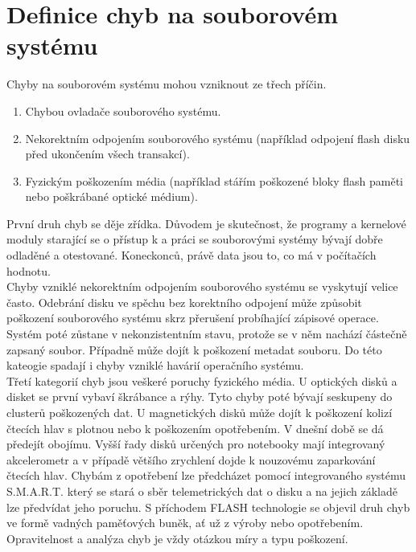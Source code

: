 \chapter{Definice chyb na souborovém systému}
Chyby na souborovém systému mohou vzniknout ze třech příčin. 
\begin{enumerate}
    \item Chybou ovladače souborového systému.
    \item Nekorektním odpojením souborového systému (například odpojení flash disku před ukončením všech transakcí).
        \item Fyzickým poškozením média (například stářím poškozené bloky flash paměti nebo poškrábané optické médium).
\end{enumerate}
První druh chyb se děje zřídka. Důvodem je skutečnost, že programy a kernelové moduly starající se o přístup k a práci se souborovými systémy bývají dobře odladěné a otestované. Koneckonců, právě data jsou to, co má v počítačích hodnotu.\\
Chyby vzniklé nekorektním odpojením souborového systému se vyskytují velice často. Odebrání disku ve spěchu bez korektního odpojení může způsobit poškození souborového systému skrz přerušení probíhající zápisové operace. Systém poté zůstane v nekonzistentním stavu, protože se v něm nachází částečně zapsaný soubor. Případně může dojít k poškození metadat souboru. Do této kateogie spadají i chyby vzniklé havárií operačního systému.\\
Třetí kategorií chyb jsou veškeré poruchy fyzického média. U optických disků a disket se první vybaví škrábance a rýhy. Tyto chyby poté bývají seskupeny do clusterů poškozených dat. U magnetických disků může dojít k poškození kolizí čtecích hlav s plotnou nebo k poškozením opotřebením. V dnešní době se dá předejít obojímu. Vyšší řady disků určených pro notebooky mají integrovaný akcelerometr a v případě většího zrychlení dojde k nouzovému zaparkování čtecích hlav. Chybám z opotřebení lze předcházet pomocí integrovaného systému S.M.A.R.T. který se stará o sběr telemetrických dat o disku a na jejich základě lze předvídat jeho poruchu. S příchodem FLASH technologie se objevil druh chyb ve formě vadných paměťových buněk, ať už z výroby nebo opotřebením.\\
Opravitelnost a analýza chyb je vždy otázkou míry a typu poškození.

